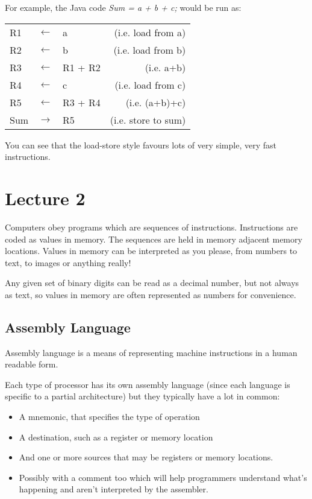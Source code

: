 \documentclass{article}
\begin{document}
For example, the Java code {\it Sum = a + b + c;} would be run as:

\begin{center}
    \begin{tabular}{l l l r}
        R1 & $\leftarrow$ & a & (i.e. load from a)\\
        R2 & $\leftarrow$ & b & (i.e. load from b)\\
        R3 & $\leftarrow$ & R1 + R2 & (i.e. a+b)\\
        R4 & $\leftarrow$ & c                      & (i.e. load from c)\\
        R5 & $\leftarrow$ & R3 + R4  & (i.e. (a+b)+c)\\
        Sum & $\rightarrow$ & R5 & (i.e. store to sum)\\
    \end{tabular}
\end{center}

You can see that the load-store style favours lots of very simple, very fast instructions.

\section{Lecture 2}
Computers obey programs which are sequences of instructions. Instructions are coded as values in memory. The sequences are held in memory adjacent memory locations. Values in memory can be interpreted as you please, from numbers to text, to images or anything really!

Any given set of binary digits can be read as a decimal number, but not always as text, so values in memory are often represented as numbers for convenience.

\subsection{Assembly Language}
Assembly language is a means of representing machine instructions in a human readable form.

Each type of processor has its own assembly language (since each language is specific to a partial architecture) but they typically have a lot in common:

\begin{itemize}
	\item A mnemonic, that specifies the type of operation
	\item A destination, such as a register or memory location
	\item And one or more sources that may be registers or memory locations.
	\item Possibly with a comment too which will help programmers understand what's happening and aren't interpreted by the assembler.
\end{itemize}
\end{document}
